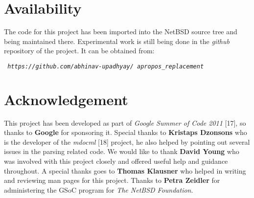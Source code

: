 \documentclass[letterpaper,twocolumn,10pt]{article}
\begin{document}
\section{Availability}
The code for this project has been imported into the NetBSD source tree and
being maintained there. Experimental work is still being done in the \textit
{github} repository of the project. It can be obtained from:\newline

{\tt
 \emph{https://github.com/abhinav-upadhyay/
 apropos\_replacement}
}


\section{Acknowledgement}
This project has been developed as part of \emph{Google Summer of Code 2011}
[17], so thanks to \textbf{Google} for sponsoring it. Special thanks to
\textbf{Kristaps Dzonsons} who is the developer of the \textit{mdocml} [18]
project, he also helped by pointing out several issues in the parsing related
code. We would like to thank \textbf{David Young} who was involved with
this project closely and offered useful help and guidance throughout. A special
thanks goes to \textbf{Thomas Klausner} who helped in writing and reviewing
man pages for this project. Thanks to \textbf{Petra Zeidler} for administering
the GSoC program for \textit{The NetBSD Foundation}. \\
\end{document}
